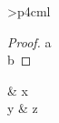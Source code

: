 \documentclass{mnras}
\begin{document}
\begin{tabu}{>{\centering}p{4cm}l}
\begin{proof}a\\b\end{proof} & x \\
y & z \\
\end{tabu}
\end{document}
